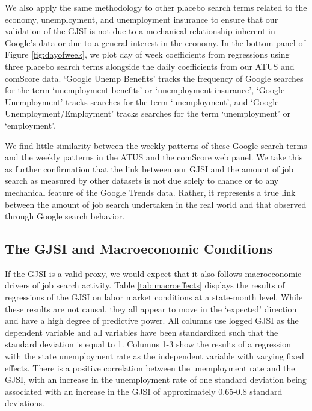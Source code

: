\documentclass[12pt]{article}
\begin{document}
\begin{spacing}{2}
We also apply the same methodology to other placebo search terms related to the economy, unemployment, and unemployment insurance to ensure that our validation of the GJSI is not due to a mechanical relationship inherent in Google's data or due to a general interest in the economy. In the bottom panel of Figure \ref{fig:dayofweek}, we plot day of week coefficients from regressions using three placebo search terms alongside the daily coefficients from our ATUS and comScore data. `Google Unemp Benefits' tracks the frequency of Google searches for the term `unemployment benefits' or `unemployment insurance', `Google Unemployment' tracks searches for the term `unemployment', and `Google Unemployment/Employment' tracks searches for the term `unemployment' or `employment'.

We find little similarity between the weekly patterns of these Google search terms and the weekly patterns in the ATUS and the comScore web panel. We take this as further confirmation that the link between our GJSI and the amount of job search as measured by other datasets is not due solely to chance or to any mechanical feature of the Google Trends data. Rather, it represents a true link between the amount of job search undertaken in the real world and that observed through Google search behavior.


\subsection{The GJSI and Macroeconomic Conditions}\label{sec:macrodrivers}
If the GJSI is a valid proxy, we would expect that it also follows macroeconomic drivers of job search activity. Table \ref{tab:macroeffects} displays the results of regressions of the GJSI on labor market conditions at a state-month level. While these results are not causal, they all appear to move in the `expected' direction and have a high degree of predictive power. All columns use logged GJSI as the dependent variable and all variables have been standardized such that the standard deviation is equal to 1. Columns 1-3 show the results of a regression with the state unemployment rate as the independent variable with varying fixed effects. There is a positive correlation between the unemployment rate and the GJSI, with an increase in the unemployment rate of one standard deviation being associated with an increase in the GJSI of approximately 0.65-0.8 standard deviations.


\end{spacing}
\end{document}
